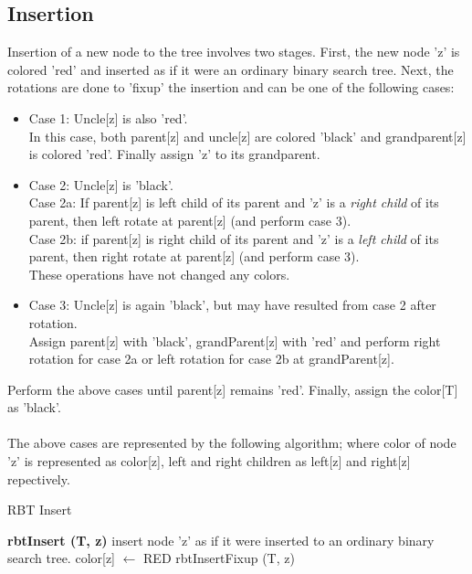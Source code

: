 \documentclass[11pt, oneside, a4paper]{article}
\begin{document}
\subsection{Insertion}
Insertion of a new node to the tree involves two stages.  First, the new node 'z' is colored 'red' and inserted as if it were an ordinary binary search tree.  Next, the rotations are done to 'fixup' the insertion and can be one of the following cases:
\begin{itemize}
\item Case 1: Uncle[z] is also 'red'.\\
	In this case, both parent[z] and uncle[z] are colored 'black' and grandparent[z] is colored 'red'.  Finally assign 'z' to its grandparent.
\item Case 2: Uncle[z] is 'black'.\\
	Case 2a: If parent[z] is left child of its parent and 'z' is a \emph {right child} of its parent, then left rotate at parent[z] (and perform case 3).\\Case 2b: if parent[z] is right child of its parent and 'z' is a \emph {left child} of its parent, then right rotate at parent[z] (and perform case 3).\\  These operations have not changed any colors.
\item Case 3: Uncle[z] is again 'black', but may have resulted from case 2 after rotation.\\
	Assign parent[z] with 'black', grandParent[z] with 'red' and perform right rotation for case 2a or left rotation for case 2b at grandParent[z].
\end{itemize}
Perform the above cases until parent[z] remains 'red'.  Finally, assign the color[T] as 'black'.\\\\
The above cases are represented by the following algorithm; where color of node 'z' is represented as color[z], left and right children as left[z] and right[z] repectively.

\begin{algorithm}
\caption {RBT Insert}
\label {alg1}
\begin{algorithmic}[1]
\STATE \textbf {rbtInsert (T, z)}
\STATE insert node 'z' as if it were inserted to an ordinary binary search tree.
\STATE color[z] $\leftarrow$ RED
\STATE rbtInsertFixup (T, z)
\end{algorithmic}
\end{algorithm}
\end{document}
